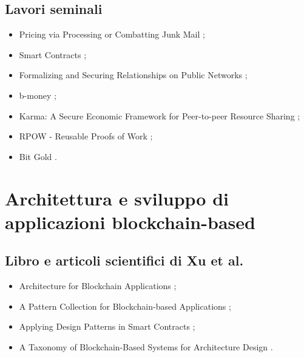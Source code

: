 \subsection*{Lavori seminali}
\begin{itemize}

\item Pricing via Processing or Combatting Junk Mail \cite{dwork1993proofofwork};

\item Smart Contracts \cite{szabo1994smartcontracts};

\item Formalizing and Securing Relationships on Public Networks \cite{szabo1997smartcontracts};

\item b-money \cite{dai1997cryptocurrency};

\item Karma: A Secure Economic Framework for Peer-to-peer Resource Sharing \cite{vishnumurthy2003proofofwork};

\item RPOW - Reusable Proofs of Work \cite{finney2004proofofwork};

\item Bit Gold \cite{szabo2005cryptocurrency}.

\end{itemize}

\clearpage
{}
\section*{Architettura e sviluppo di applicazioni blockchain-based}

\subsection*{Libro e articoli scientifici di Xu et al.}
\begin{itemize}

\item Architecture for Blockchain Applications \cite{xu2019book};

\item A Pattern Collection for Blockchain-based Applications \cite{xu2018patterns};

\item Applying Design Patterns in Smart Contracts \cite{xu2018design};

\item A Taxonomy of Blockchain-Based Systems for Architecture Design \cite{xu2017architecture}.

\end{itemize}

